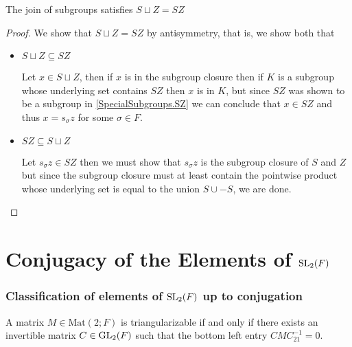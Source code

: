 \begin{lemma}
    \label{SpecialSubgroups.S_join_Z_eq_SZ}
    \leanok
    The join of subgroups satisfies $S \sqcup Z = SZ$
\end{lemma}
\begin{proof}
\leanok
We show that $S \sqcup Z = SZ$ by antisymmetry, that is, we show both that
\begin{itemize}
    
    \item $S \sqcup Z \subseteq SZ$
    
    Let $x \in S \sqcup Z$, then if $x$ is in the subgroup closure then if $K$ is a subgroup whose underlying set contains $SZ$ then $x$ is in $K$,
    but since $SZ$ was shown to be a subgroup in \ref{SpecialSubgroups.SZ} we can conclude that $x \in SZ$ and thus $x = s_\sigma z$ for some $\sigma \in F$.
    
    \item $SZ \subseteq S \sqcup Z$
    
    Let $s_\sigma z \in SZ$ then we must show that $s_\sigma z$ is the subgroup closure of $S$ and $Z$ but since the subgroup closure 
    must at least contain the pointwise product whose underlying set is equal to the union $S \cup -S$, we are done.
\end{itemize}
\end{proof}


\section{Conjugacy of the Elements of $\operatorname{SL}_2(F)$}

\subsubsection{Classification of elements of $\operatorname{SL}_2(F)$ up to conjugation}

\begin{lemma}
\label{isConj_upper_triangular_iff}
\leanok
    A matrix $M \in\textrm{Mat}(2; F)$ is triangularizable if and only if there exists an invertible matrix $C \in \operatorname{GL}_2(F)$ such that the bottom left entry
    $C M C^{-1}_{21} = 0$.
\end{lemma}

